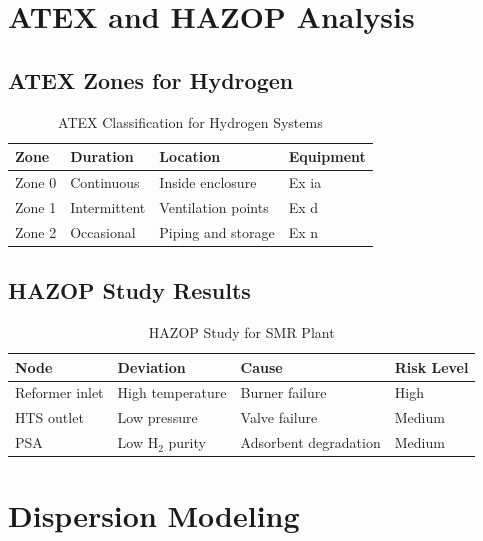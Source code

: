 \documentclass[12pt,twoside,openany]{book}
\newcommand{\tighttabular}{\small\setlength{\tabcolsep}{3.5pt}}
\begin{document}
\section{ATEX and HAZOP Analysis}

\subsection{ATEX Zones for Hydrogen}

\begin{table}[htbp]
    \centering
    \tighttabular
    \caption{ATEX Classification for Hydrogen Systems}
    \label{tab:atex}
    \begin{tabular}{L{2.8cm} C{2.25cm} C{4cm} C{2.2cm}}
    \hline
    \textbf{Zone} & \textbf{Duration} & \textbf{Location} & \textbf{Equipment} \\
    \hline
    Zone 0 & Continuous & Inside enclosure & Ex ia \\
    Zone 1 & Intermittent & Ventilation points & Ex d \\
    Zone 2 & Occasional & Piping and storage & Ex n \\
    \hline
    \end{tabular}
\end{table}

\subsection{HAZOP Study Results}

\begin{table}[htbp]
    \centering
    \caption{HAZOP Study for SMR Plant}
    \label{tab:hazop}
    \begin{tabular}{L{3cm} C{2cm} C{3cm} C{2cm}}
    \hline
    \textbf{Node} & \textbf{Deviation} & \textbf{Cause} & \textbf{Risk Level} \\
    \hline
    Reformer inlet & High temperature & Burner failure & High \\
    HTS outlet     & Low pressure & Valve failure & Medium \\
    PSA             & Low H$_2$ purity & Adsorbent degradation & Medium \\
    \hline
    \end{tabular}
\end{table}

\section{Dispersion Modeling}
\end{document}
